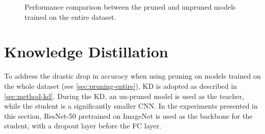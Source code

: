 \begin{figure}[H]
	\centering
    \qquad
	\caption{Performance comparison between the pruned and unpruned models trained on the entire dataset.}%
	\label{fig:exp7}
\end{figure}

\newpage

\section{Knowledge Distillation}
\label{sec:exp-kd}
To address the drastic drop in accuracy when using pruning on models trained on the whole dataset (see \autoref{sec:pruning-entire}), KD is adopted as described in \autoref{sec:method-kd}. During the KD, an un-pruned model is used as the teacher, while the student is a significantly smaller CNN. In the experiments presented in this section, ResNet-50 pretrained on ImageNet is used as the backbone for the student, with a dropout layer before the FC layer.

